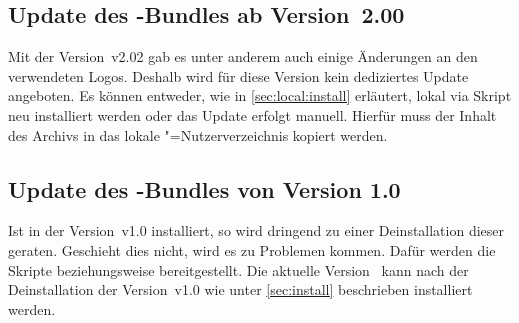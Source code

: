 \subsection{Update des \TUDScript-Bundles ab Version~2.00}
Mit der Version~v2.02 gab es unter anderem auch einige Änderungen an den 
verwendeten Logos. Deshalb wird für diese Version kein dediziertes Update 
angeboten. Es können entweder, wie in \autoref{sec:local:install} erläutert, 
lokal via Skript neu installiert werden oder das Update erfolgt manuell. 
Hierfür muss der Inhalt des Archivs
%
{} in das lokale "=Nutzerverzeichnis 
kopiert werden.



%
%
%
\subsection{Update des \TUDScript-Bundles von Version 1.0}
%
%
Ist \TUDScript in der Version~v1.0 installiert, so wird dringend zu einer 
Deinstallation dieser geraten. Geschieht dies nicht, wird es zu Problemen 
kommen. Dafür werden die Skripte 
beziehungsweise
bereitgestellt. Die aktuelle Version~\vTUDScript{} kann nach der Deinstallation 
der Version~v1.0 wie unter \autoref{sec:install} beschrieben installiert werden.

